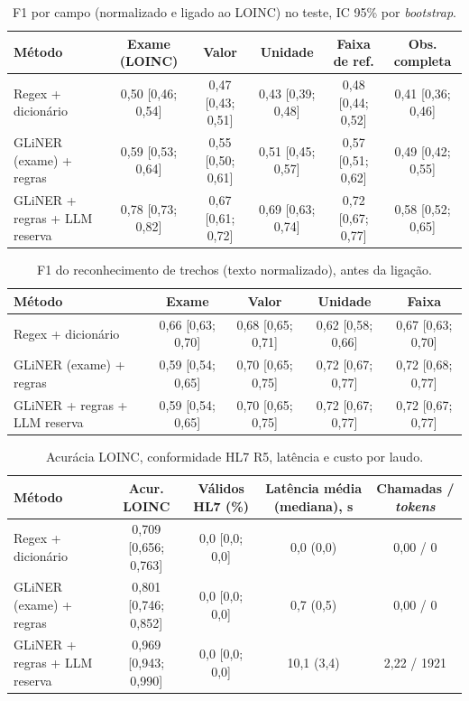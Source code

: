 \begin{table}[ht]\centering\small
\caption{F1 por campo (normalizado e ligado ao LOINC) no teste, IC 95\% por \textit{bootstrap}.}\label{tab:campos}
\begin{tabular}{lccccc}\toprule
Método & Exame (LOINC) & Valor & Unidade & Faixa de ref. & Obs. completa\\\midrule
Regex + dicionário & 0,50 [0,46; 0,54] & 0,47 [0,43; 0,51] & 0,43 [0,39; 0,48] & 0,48 [0,44; 0,52] & 0,41 [0,36; 0,46]\\
GLiNER (exame) + regras & 0,59 [0,53; 0,64] & 0,55 [0,50; 0,61] & 0,51 [0,45; 0,57] & 0,57 [0,51; 0,62] & 0,49 [0,42; 0,55]\\
GLiNER + regras + LLM reserva & 0,78 [0,73; 0,82] & 0,67 [0,61; 0,72] & 0,69 [0,63; 0,74] & 0,72 [0,67; 0,77] & 0,58 [0,52; 0,65]\\
\bottomrule\end{tabular}\end{table}

\begin{table}[ht]\centering\small
\caption{F1 do reconhecimento de trechos (texto normalizado), antes da ligação.}\label{tab:spans}
\begin{tabular}{lcccc}\toprule
Método & Exame & Valor & Unidade & Faixa\\\midrule
Regex + dicionário & 0,66 [0,63; 0,70] & 0,68 [0,65; 0,71] & 0,62 [0,58; 0,66] & 0,67 [0,63; 0,70]\\
GLiNER (exame) + regras & 0,59 [0,54; 0,65] & 0,70 [0,65; 0,75] & 0,72 [0,67; 0,77] & 0,72 [0,68; 0,77]\\
GLiNER + regras + LLM reserva & 0,59 [0,54; 0,65] & 0,70 [0,65; 0,75] & 0,72 [0,67; 0,77] & 0,72 [0,67; 0,77]\\
\bottomrule\end{tabular}\end{table}

\begin{table}[ht]\centering\small
\caption{Acurácia LOINC, conformidade HL7 R5, latência e custo por laudo.}\label{tab:fhir}
\begin{tabular}{lcccc}\toprule
Método & Acur. LOINC & Válidos HL7 (\%) & Latência média (mediana), s & Chamadas / \textit{tokens}\\\midrule
Regex + dicionário & 0,709 [0,656; 0,763] & 0,0 [0,0; 0,0] & 0,0 (0,0) & 0,00 / 0\\
GLiNER (exame) + regras & 0,801 [0,746; 0,852] & 0,0 [0,0; 0,0] & 0,7 (0,5) & 0,00 / 0\\
GLiNER + regras + LLM reserva & 0,969 [0,943; 0,990] & 0,0 [0,0; 0,0] & 10,1 (3,4) & 2,22 / 1921\\
\bottomrule\end{tabular}\end{table}

